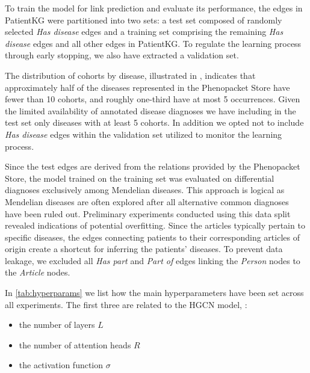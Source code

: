 To train the model for link prediction and evaluate its performance, the edges in PatientKG were partitioned into two sets: a test set composed of randomly selected \emph{Has disease} edges and a training set comprising the remaining \emph{Has disease} edges and all other edges in PatientKG. To regulate the learning process through early stopping, we also have extracted a validation set.

The distribution of cohorts by disease, illustrated in , indicates that approximately half of the diseases represented in the Phenopacket Store have fewer than 10 cohorts, and roughly one-third have at most 5 occurrences. Given the limited availability of annotated disease diagnoses we have including in the test set only diseases with at least 5 cohorts. In addition we opted not to include \emph{Has disease} edges within the validation set utilized to monitor the learning process.

Since the test edges are derived from the relations provided by the Phenopacket Store, the model trained on the training set was evaluated on differential diagnoses exclusively among Mendelian diseases. This approach is logical as Mendelian diseases are often explored after all alternative common diagnoses have been ruled out. Preliminary experiments conducted using this data split revealed indications of potential overfitting. Since the articles typically pertain to specific diseases, the edges connecting patients to their corresponding articles of origin create a shortcut for inferring the patients' diseases. To prevent data leakage, we excluded all \emph{Has part} and \emph{Part of} edges linking the \emph{Person} nodes to the \emph{Article} nodes.

\medskip

In \cref{tab:hyperparams} we list how the main hyperparameters have been set across all experiments. The first three are related to the HGCN model, :
\begin{itemize}
  \item the number of layers $L$
  \item the number of attention heads $R$
  \item the activation function $\sigma$ 
\end{itemize}




